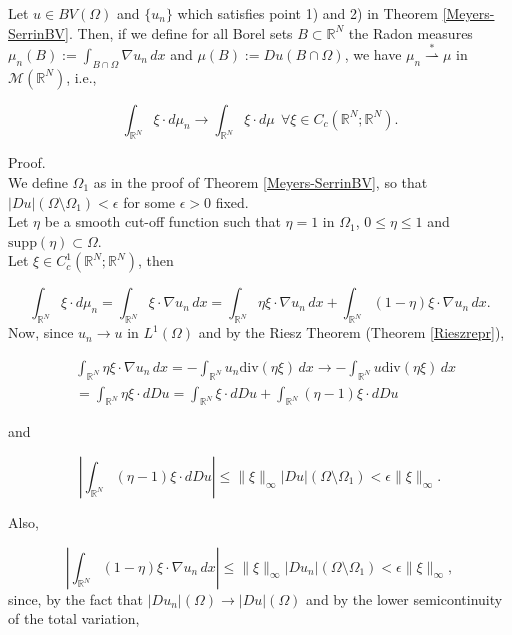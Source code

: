 \begin{lemma} \label{BVweak-star} Let $u \in BV(\Omega)$ and $\{u_{n}\}$ which satisfies point 1) and 2) in Theorem \ref{Meyers-SerrinBV}. Then, if we define for all Borel sets $B \subset \mathbb{R}^{N}$ the Radon measures $\mu_{n}(B) := \int_{B \cap \Omega} \nabla u_{n} \, dx$ and $\mu(B) := Du(B \cap \Omega)$, we have $\mu_{n} \stackrel {*}{\rightharpoonup} \mu$ in $\mathcal{M}(\mathbb{R}^{N})$, i.e., 

\[ \int_{\mathbb{R}^{N}} \xi \cdot d \mu_{n} \to \int_{\mathbb{R}^{N}} \xi \cdot d \mu \  \ \forall \xi \in C_{c}(\mathbb{R}^{N}; \mathbb{R}^{N}). \]
\end{lemma}
Proof. 
\\
We define $\Omega_{1}$ as in the proof of Theorem \ref{Meyers-SerrinBV}, so that $|Du|(\Omega \setminus \Omega_{1}) < \epsilon$ for some $\epsilon > 0$ fixed. 
\\
Let $\eta$ be a smooth cut-off function such that $\eta = 1$ in $\Omega_{1}$, $0 \le \eta \le 1$ and $\mathrm{supp}(\eta) \subset \Omega$.
\\
Let $\xi \in C^{1}_{c}(\mathbb{R}^{N}; \mathbb{R}^{N})$, then

\[ \int_{\mathbb{R}^{N}} \xi \cdot d \mu_{n} = \int_{\mathbb{R}^{N}} \xi \cdot \nabla u_{n} \, dx = \int_{\mathbb{R}^{N}} \eta \xi \cdot \nabla u_{n} \, dx + \int_{\mathbb{R}^{N}} (1 - \eta) \xi \cdot \nabla u_{n} \, dx. \]
Now, since $u_{n} \to u$ in $L^{1}(\Omega)$ and by the Riesz Theorem (Theorem \ref{Rieszrepr}),  

\begin{align*} & \int_{\mathbb{R}^{N}} \eta \xi \cdot \nabla u_{n} \, dx = - \int_{\mathbb{R}^{N}} u_{n} \mathrm{div}(\eta \xi) \, dx \to - \int_{\mathbb{R}^{N}} u \mathrm{div}(\eta \xi) \, dx \\
& = \int_{\mathbb{R}^{N}} \eta \xi \cdot d Du = \int_{\mathbb{R}^{N}} \xi \cdot d Du + \int_{\mathbb{R}^{N}} (\eta - 1) \xi \cdot d Du \end{align*}

and 

\[ \left | \int_{\mathbb{R}^{N}} (\eta - 1) \xi \cdot d Du \right | \le \|\xi\|_{\infty} |Du|( \Omega \setminus \Omega_{1}) < \epsilon \|\xi\|_{\infty}. \]

Also,

\[ \left | \int_{\mathbb{R}^{N}} (1 - \eta) \xi \cdot \nabla u_{n} \, dx \right | \le \|\xi\|_{\infty} |Du_{n}|(\Omega \setminus \Omega_{1}) < \epsilon \|\xi\|_{\infty}, \]
since, by the fact that $|Du_{n}|(\Omega) \to |Du|(\Omega)$ and by the lower semicontinuity of the total variation,


